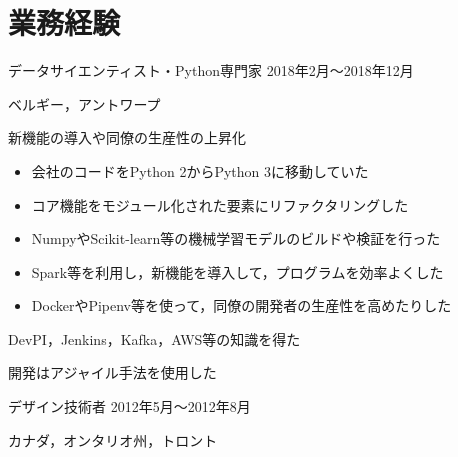 \documentclass[10pt, a4paper]{article}
\begin{document}
\section{業務経験}
\begin{outerlist}
\item[\href{https://sentiance.com}{\parbox[t]{3cm}{\raggedleft Sentiance有限会社}}]{データサイエンティスト・Python専門家} \hfill {2018年2月〜2018年12月}

\hfill ベルギー，アントワープ
    \begin{innerlist}
    \item 新機能の導入や同僚の生産性の上昇化
    \begin{itemize}
        \item 会社のコードをPython 2からPython 3に移動していた
        \item コア機能をモジュール化された要素にリファクタリングした
        \item NumpyやScikit-learn等の機械学習モデルのビルドや検証を行った
        \item Spark等を利用し，新機能を導入して，プログラムを効率よくした
        \item DockerやPipenv等を使って，同僚の開発者の生産性を高めたりした
    \end{itemize}
    \item DevPI，Jenkins，Kafka，AWS等の知識を得た
    \item 開発はアジャイル手法を使用した
    \end{innerlist}

\item[\href{http://starquip.com/}{\parbox[t]{3cm}{\raggedleft Starquip Integrated Systems有限会社}}]{デザイン技術者} \hfill {2012年5月〜2012年8月}

\vspace{-\baselineskip}    
\hfill カナダ，オンタリオ州，トロント


\end{outerlist}
\end{document}
